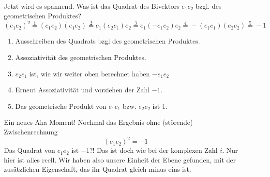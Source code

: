 \documentclass[fleqn]{scrartcl}
\numberwithin{equation}{section}
\begin{document}
\begin{center}
\begin{minipage}{\linewidth}
\centering
{}
\label{fig:orientationPlane2}
\end{minipage}
\end{center}
Jetzt wird es spannend. Was ist das Quadrat des Bivektors $e_1e_2$ bzgl. des
geometrischen Produktes?
\[(e_1e_2)^2\stackrel{1}=(e_1e_2)(e_1e_2)\stackrel{2}=e_1(e_2e_1)e_2\stackrel{3}=e_1(-e_1e_2)e_2\stackrel{4}=-(e_1e_1)(e_2e_2)\stackrel{5}=-1\]
\begin{enumerate}
    \item Ausschreiben des Quadrats bzgl des geometrischen Produktes.
    \item Assoziativität des geometrischen Produktes.
    \item $e_2e_1$ ist, wie wir weiter oben berechnet haben $-e_1e_2$
    \item Erneut Assoziativität und vorziehen der Zahl $-1$.
    \item Das geometrische Produkt von $e_1e_1$ bzw. $e_2e_2$ ist $1$.
\end{enumerate}
Ein neues Aha Moment! Nochmal das Ergebnis ohne (störende) Zwischenrechnung
\[(e_1e_2)^2=-1\]
Das Quadrat von $e_1e_2$ ist $-1$?! Das ist doch wie bei der komplexen Zahl
$i$. Nur hier ist alles reell. Wir haben also unsere Einheit der Ebene
gefunden, mit der zusätzlichen Eigenschaft, das ihr Quadrat gleich minus eins
ist.
\end{document}
